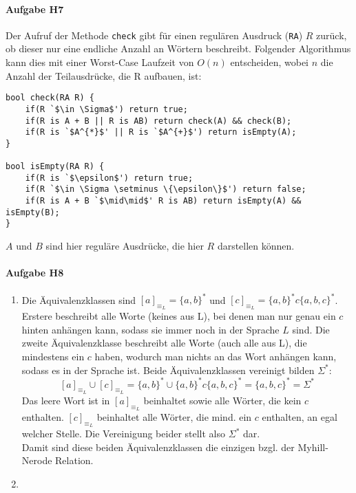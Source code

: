\documentclass[11pt]{article}
\begin{document}

\paragraph{Aufgabe H7}
Der Aufruf der Methode \verb|check| gibt für einen regulären Ausdruck (\verb|RA|) $R$ zurück, ob dieser nur eine endliche Anzahl an Wörtern beschreibt. Folgender Algorithmus kann dies mit einer Worst-Case Laufzeit von $O(n)$ entscheiden, wobei $n$ die Anzahl der Teilausdrücke, die R aufbauen, ist:
\begin{lstlisting}[escapeinside=`']
bool check(RA R) {
	if(R `$\in \Sigma$') return true;
	if(R is A + B || R is AB) return check(A) && check(B);
	if(R is `$A^{*}$' || R is `$A^{+}$') return isEmpty(A);
}

bool isEmpty(RA R) {
	if(R is `$\epsilon$') return true;
	if(R `$\in \Sigma \setminus \{\epsilon\}$') return false;
	if(R is A + B `$\mid\mid$' R is AB) return isEmpty(A) && isEmpty(B);
}
\end{lstlisting}
$A$ und $B$ sind hier reguläre Ausdrücke, die hier $R$ darstellen können.

\paragraph{Aufgabe H8}
\begin{enumerate}[label=\alph*)]
\item 	Die Äquivalenzklassen sind $[a]_{\equiv _{L}} = \{a,b\}^{*}$ und $[c]_{\equiv _{L}} = \{a,b\}^{*}c\{a,b,c\}^{*}$. Erstere beschreibt alle Worte (keines aus L), bei denen man nur genau ein $c$ hinten anhängen kann, sodass sie immer noch in der Sprache $L$ sind. Die zweite Äquivalenzklasse beschreibt alle Worte (auch alle aus L), die mindestens ein $c$ haben, wodurch man nichts an das Wort anhängen kann, sodass es in der Sprache ist. Beide Äquivalenzklassen vereinigt bilden $\Sigma^{*}$:
\[[a]_{\equiv _{L}} \cup [c]_{\equiv _{L}} = \{a,b\}^{*} \cup \{a,b\}^{*}c\{a,b,c\}^{*} = \{a,b,c\}^{*} = \Sigma^{*}\]
Das leere Wort ist in $[a]_{\equiv _{L}}$ beinhaltet sowie alle Wörter, die kein $c$ enthalten. $[c]_{\equiv _{L}}$ beinhaltet alle Wörter, die mind. ein $c$ enthalten, an egal welcher Stelle. Die Vereinigung beider stellt also $\Sigma^{*}$ dar. 
\\Damit sind diese beiden Äquivalenzklassen die einzigen bzgl. der Myhill-Nerode Relation.

\item	
\end{enumerate}
\end{document}
